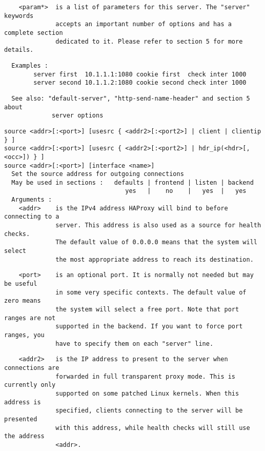 \begin{verbatim}
    <param*>  is a list of parameters for this server. The "server" keywords
              accepts an important number of options and has a complete section
              dedicated to it. Please refer to section 5 for more details.
\end{verbatim}

\begin{verbatim}
  Examples :
        server first  10.1.1.1:1080 cookie first  check inter 1000
        server second 10.1.1.2:1080 cookie second check inter 1000
\end{verbatim}

\begin{verbatim}
  See also: "default-server", "http-send-name-header" and section 5 about
             server options
\end{verbatim}

\begin{verbatim}
source <addr>[:<port>] [usesrc { <addr2>[:<port2>] | client | clientip } ]
source <addr>[:<port>] [usesrc { <addr2>[:<port2>] | hdr_ip(<hdr>[,<occ>]) } ]
source <addr>[:<port>] [interface <name>]
  Set the source address for outgoing connections
  May be used in sections :   defaults | frontend | listen | backend
                                 yes   |    no    |   yes  |   yes
  Arguments :
    <addr>    is the IPv4 address HAProxy will bind to before connecting to a
              server. This address is also used as a source for health checks.
              The default value of 0.0.0.0 means that the system will select
              the most appropriate address to reach its destination.
\end{verbatim}

\begin{verbatim}
    <port>    is an optional port. It is normally not needed but may be useful
              in some very specific contexts. The default value of zero means
              the system will select a free port. Note that port ranges are not
              supported in the backend. If you want to force port ranges, you
              have to specify them on each "server" line.
\end{verbatim}

\begin{verbatim}
    <addr2>   is the IP address to present to the server when connections are
              forwarded in full transparent proxy mode. This is currently only
              supported on some patched Linux kernels. When this address is
              specified, clients connecting to the server will be presented
              with this address, while health checks will still use the address
              <addr>.
\end{verbatim}

